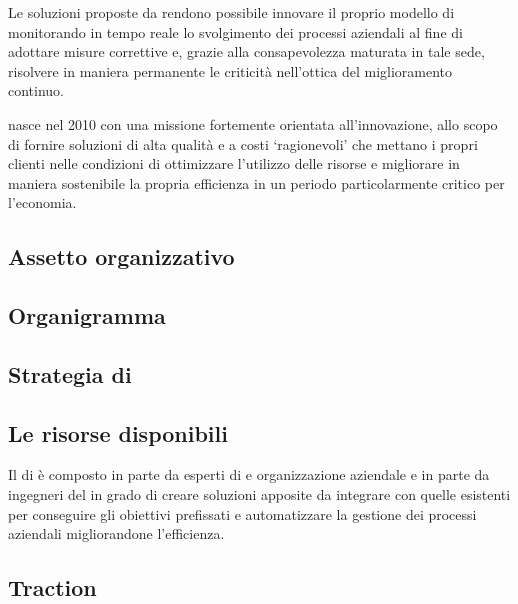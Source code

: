 Le soluzioni proposte da \team rendono possibile innovare il proprio modello di \bsn monitorando in tempo reale lo svolgimento dei processi aziendali al fine di adottare misure correttive  e, grazie alla consapevolezza maturata in tale sede, risolvere in maniera permanente le criticità nell'ottica del miglioramento continuo.

\team nasce nel 2010 con una missione fortemente orientata all'innovazione, allo scopo di fornire soluzioni \sw di alta qualità e a costi `ragionevoli' che mettano i propri clienti nelle condizioni di ottimizzare l'utilizzo delle risorse e migliorare in maniera sostenibile la propria efficienza in un periodo particolarmente critico per l'economia.

\subsection{Assetto organizzativo}

\subsection{Organigramma}

\subsection{Strategia di }

\subsection{Le risorse disponibili}
Il  di \team è composto in parte da esperti di \bsn {} e organizzazione aziendale e in parte da ingegneri del \sw in grado di creare soluzioni apposite da integrare con quelle esistenti per conseguire gli obiettivi prefissati e automatizzare la gestione dei processi aziendali migliorandone l'efficienza.


\subsection{Traction}

